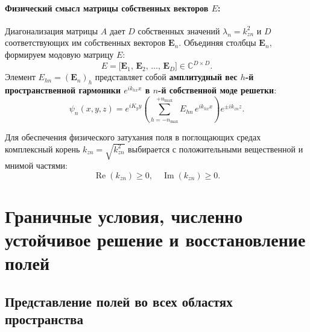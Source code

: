 \documentclass[a4paper,11pt]{article}
\begin{document}
\paragraph{Физический смысл матрицы собственных векторов $E$:}
Диагонализация матрицы $A$ дает $D$ собственных значений $\lambda_n = k_{zn}^2$ и $D$ соответствующих им собственных векторов $\mathbf{E}_n$. Объединяя столбцы $\mathbf{E}_n$, формируем модовую матрицу $E$:
\begin{equation}
    E = \big[ \mathbf{E}_1, \, \mathbf{E}_2, \, \dots, \, \mathbf{E}_D \big] \in \mathbb{C}^{D \times D}.
\end{equation}
Элемент $E_{hn} = (\mathbf{E}_n)_h$ представляет собой \textbf{амплитудный вес $h$-й пространственной гармоники $e^{i k_{hx} x}$ в $n$-й собственной моде решетки}:
\begin{equation}
    \psi_n(x, y, z) = e^{i K_y y} \left( \sum_{h=-n_{\max}}^{+n_{\max}} E_{hn} \, e^{i k_{hx} x} \right) e^{\pm i k_{zn} z}.
\end{equation}

Для обеспечения физического затухания поля в поглощающих средах комплексный корень $k_{zn} = \sqrt{k_{zn}^2}$ выбирается с положительными вещественной и мнимой частями:
\begin{equation}
    \operatorname{Re}(k_{zn}) \ge 0, \quad \operatorname{Im}(k_{zn}) \ge 0.
\end{equation}

\newpage
\section{Граничные условия, численно устойчивое решение и восстановление полей}

\subsection{Представление полей во всех областях пространства}
\end{document}
